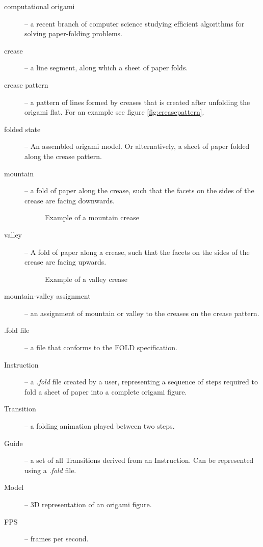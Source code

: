 \begin{description}
	\item[computational origami] \label{dictionary:computational-origami} -- a recent branch of computer science studying efficient algorithms for solving paper-folding problems.\cite{recent-results-in-computational-origami:paper}
	\item[crease] -- a line segment, along which a sheet of paper folds.
	\item[crease pattern] \label{dictionary:crease-pattern} -- a pattern of lines formed by creases that is created after unfolding the origami flat. For an example see figure \ref{fig:creasepattern}.
	\item[folded state] \label{dictionary:folded-state} -- An assembled origami model. Or alternatively, a sheet of paper folded along the crease pattern.
	\item[mountain] -- a fold of paper along the crease, such that the facets on the sides of the crease are facing downwards.
					\begin{figure}[H]
						\caption{Example of a mountain crease}
						\centering
					\end{figure}
	\item[valley] -- A fold of paper along a crease, such that the facets on the sides of the crease are facing upwards.
					\begin{figure}[H]
						\caption{Example of a valley crease}
						\centering
					\end{figure}
	\item[mountain-valley assignment] -- an assignment of mountain or valley to the creases on the crease pattern.
	\item[.fold file] -- a file that conforms to the FOLD\cite{fold:paper} specification.
	\item[Instruction] -- a \textit{.fold} file created by a user, representing a sequence of steps required to
		fold a sheet of paper into a complete origami figure.
	\item[Transition] -- a folding animation played between two steps.
	\item[Guide] -- a set of all Transitions derived from an Instruction. Can be represented using a \textit{.fold} file.
	\item[Model] -- 3D representation of an origami figure. 
	\item[FPS] -- frames per second.
\end{description}

